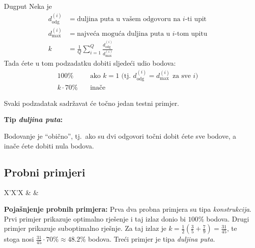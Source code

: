 \begin{statement}[
  problempoints=100,
  timelimit=5 sekundi,
  memorylimit=512 MiB,
]{Dugput}
Neka je
\begin{align*}
    d_\mathrm{odg}^{(i)} &= \text{duljina puta u vašem odgovoru na $i$-ti upit} \\ 
    d_\mathrm{max}^{(i)} &= \text{najveća moguća duljina puta u $i$-tom upitu} \\
    k &= \frac{1}{Q} \sum_{i=1}^Q \frac{d_\mathrm{odg}^{(i)}}{d_\mathrm{max}^{(i)}}
\end{align*}
Tada ćete u tom podzadatku dobiti sljedeći udio bodova:
\begin{align*}
    100\% &\quad \text{ako $k = 1$ (tj.\ $d_\mathrm{odg}^{(i)} = d_\mathrm{max}^{(i)}$ za sve $i$)} \\
    k \cdot 70\% &\quad \text{inače}
\end{align*}

Svaki podzadatak sadržavat će točno jedan testni primjer.

\textbf{Tip \textit{duljina puta}:}

Bodovanje je ``obično'', tj.\ ako su dvi odgovori točni dobit ćete sve bodove,
a inače ćete dobiti nula bodova.

\subsection*{Probni primjeri}
\begin{tabularx}{\textwidth}{X'X'X}
 &
 &
\end{tabularx}

\textbf{Pojašnjenje probnih primjera:}
Prva dva probna primjera su tipa \textit{konstrukcija}.
Prvi primjer prikazuje optimalno rješenje i taj izlaz donio bi $100\%$ bodova.
Drugi primjer prikazuje suboptimalno rješnje. Za taj izlaz je $k = \frac{1}{2} (\frac{3}{5} + \frac{7}{9}) = \frac{31}{45}$, te stoga nosi $\frac{31}{45} \cdot 70\% \approx 48.2\%$ bodova.
Treći primjer je tipa \textit{duljina puta}.


\end{statement}

